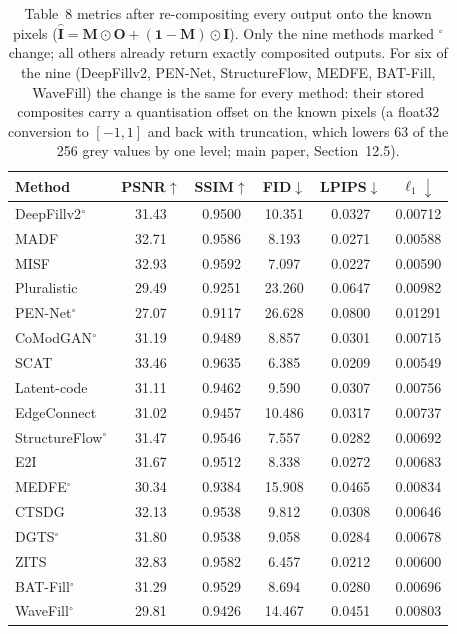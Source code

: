 \begin{table}[p]\centering\scriptsize\setlength{\tabcolsep}{3pt}
\renewcommand{\thetable}{S3}\caption{Table~8 metrics after re-compositing every output onto the known pixels ($\hat{\mathbf I}=\mathbf M\odot\mathbf O+(\mathbf 1-\mathbf M)\odot\mathbf I$). Only the nine methods marked $^{\circ}$ change; all others already return exactly composited outputs. For six of the nine (DeepFillv2, PEN-Net, StructureFlow, MEDFE, BAT-Fill, WaveFill) the change is the same for every method: their stored composites carry a quantisation offset on the known pixels (a float32 conversion to $[-1,1]$ and back with truncation, which lowers 63 of the 256 grey values by one level; main paper, Section~12.5).}
\label{tab:S3}
\begin{tabular}{@{}lccccc@{}}
\toprule
Method & PSNR$\uparrow$ & SSIM$\uparrow$ & FID$\downarrow$ & LPIPS$\downarrow$ & $\ell_1\downarrow$ \\
\midrule
DeepFillv2$^{\circ}$ & 31.43 & 0.9500 & 10.351 & 0.0327 & 0.00712 \\
MADF & 32.71 & 0.9586 & 8.193 & 0.0271 & 0.00588 \\
MISF & 32.93 & 0.9592 & 7.097 & 0.0227 & 0.00590 \\
Pluralistic & 29.49 & 0.9251 & 23.260 & 0.0647 & 0.00982 \\
PEN-Net$^{\circ}$ & 27.07 & 0.9117 & 26.628 & 0.0800 & 0.01291 \\
CoModGAN$^{\circ}$ & 31.19 & 0.9489 & 8.857 & 0.0301 & 0.00715 \\
SCAT & 33.46 & 0.9635 & 6.385 & 0.0209 & 0.00549 \\
Latent-code & 31.11 & 0.9462 & 9.590 & 0.0307 & 0.00756 \\
EdgeConnect & 31.02 & 0.9457 & 10.486 & 0.0317 & 0.00737 \\
StructureFlow$^{\circ}$ & 31.47 & 0.9546 & 7.557 & 0.0282 & 0.00692 \\
E2I & 31.67 & 0.9512 & 8.338 & 0.0272 & 0.00683 \\
MEDFE$^{\circ}$ & 30.34 & 0.9384 & 15.908 & 0.0465 & 0.00834 \\
CTSDG & 32.13 & 0.9538 & 9.812 & 0.0308 & 0.00646 \\
DGTS$^{\circ}$ & 31.80 & 0.9538 & 9.058 & 0.0284 & 0.00678 \\
ZITS & 32.83 & 0.9582 & 6.457 & 0.0212 & 0.00600 \\
BAT-Fill$^{\circ}$ & 31.29 & 0.9529 & 8.694 & 0.0280 & 0.00696 \\
WaveFill$^{\circ}$ & 29.81 & 0.9426 & 14.467 & 0.0451 & 0.00803 \\

\end{tabular}
\end{table}

